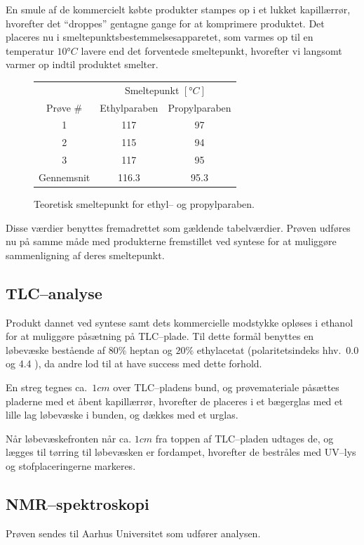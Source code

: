     En smule af de kommercielt købte produkter stampes op i et lukket kapillærrør, hvorefter det ``droppes'' gentagne gange for at komprimere produktet. Det placeres nu i smeltepunktsbestemmelsesapparetet, som varmes op til en temperatur $10\si{\degree C}$ lavere end det forventede smeltepunkt, hvorefter vi langsomt varmer op indtil produktet smelter.
    \begin{figure}[H]\centering
        \caption{Teoretisk smeltepunkt for ethyl-- og propylparaben.}
        \begin{tabular}{ccc}
            \toprule
            & \multicolumn{2}{c}{Smeltepunkt $\left[\si{\degree C}\right]$} \\
            \cmidrule(r){2-3}
            Prøve # & Ethylparaben & Propylparaben \\
            \midrule
            1 & 117 & 97 \\
            2 & 115 & 94 \\
            3 & 117 & 95 \\
            \midrule
            Gennemsnit & 116.3 & 95.3 \\
            \bottomrule
        \end{tabular}
    \end{figure}
    Disse værdier benyttes fremadrettet som gældende tabelværdier. Prøven udføres nu på samme måde med produkterne fremstillet ved syntese for at muliggøre sammenligning af deres smeltepunkt.

    \subsection{TLC--analyse}
    Produkt dannet ved syntese samt dets kommercielle modstykke opløses i ethanol for at muliggøre påsætning på TLC--plade. Til dette formål benyttes en løbevæske bestående af $80\%$ heptan og $20\%$ ethylacetat (polaritetsindeks hhv.\ 0.0 og 4.4 \parencite{Phen}), da andre lod til at have success med dette forhold.

    En streg tegnes ca.\ $1\si{cm}$ over TLC--pladens bund, og prøvemateriale påsættes pladerne med et åbent kapillærrør, hvorefter de placeres i et bægerglas med et lille lag løbevæske i bunden, og dækkes med et urglas.

    Når løbevæskefronten når ca. $1\si{cm}$ fra toppen af TLC--pladen udtages de, og lægges til tørring til løbevæsken er fordampet, hvorefter de bestråles med UV--lys og stofplaceringerne markeres.

    \subsection{NMR--spektroskopi}
    Prøven sendes til Aarhus Universitet som udfører analysen.

